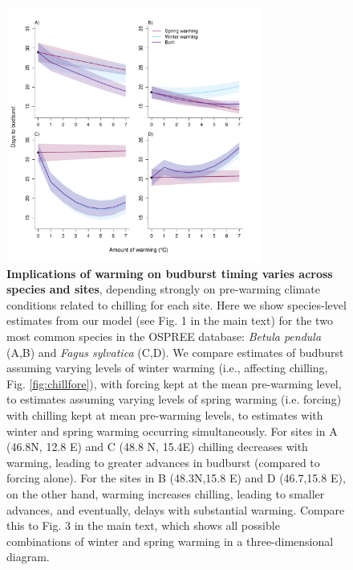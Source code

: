 \documentclass{article}
\begin{document}
\begin{figure}[h!]
\centering
\noindent \includegraphics[width=0.75\textwidth]{..//..//analyses/bb_analysis/figures/forecasting/tempforecastbothspp_1_7_degwarm.pdf}
\caption{\textbf{Implications of warming on budburst timing varies across species and sites}, depending strongly on pre-warming climate conditions related to chilling for each site. Here we show species-level estimates from our model (see Fig. 1 in the main text) for the two most common species in the OSPREE database: \emph{Betula pendula} (A,B) and \emph{Fagus sylvatica} (C,D). We compare estimates of budburst assuming varying levels of winter warming (i.e., affecting chilling, Fig. \ref{fig:chillfore}), with forcing kept at the mean pre-warming level, to estimates assuming varying levels of spring warming (i.e. forcing) with chilling kept at mean pre-warming levels, to estimates with winter and spring warming occurring simultaneously. For sites in A (46.8\degree N, 12.8 \degree E) and C (48.8 \degree N, 15.4\degree E) chilling decreases with warming, leading to greater advances in budburst (compared to forcing alone). For the sites in B (48.3\degree N,15.8 \degree E) and D (46.7,15.8 \degree E), on the other hand, warming increases chilling, leading to smaller advances, and eventually, delays with substantial warming.  Compare  this to Fig. 3 in the main text, which shows all possible combinations of winter and spring warming in a three-dimensional diagram.}
\label{fig:betpenfagsyl}
\end{figure}
\end{document}
